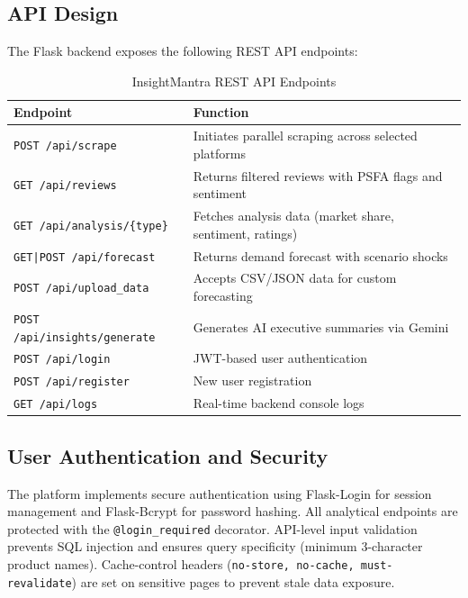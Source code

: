 \documentclass[conference]{IEEEtran}
\begin{document}
\subsection{API Design}

The Flask backend exposes the following REST API endpoints:

\begin{table}[htbp]
\caption{InsightMantra REST API Endpoints}
\begin{center}
\begin{tabular}{p{2.8cm}p{4.7cm}}
\toprule
\textbf{Endpoint} & \textbf{Function} \\
\midrule
\texttt{POST /api/scrape} & Initiates parallel scraping across selected platforms \\
\texttt{GET /api/reviews} & Returns filtered reviews with PSFA flags and sentiment \\
\texttt{GET /api/analysis/\{type\}} & Fetches analysis data (market share, sentiment, ratings) \\
\texttt{GET|POST /api/forecast} & Returns demand forecast with scenario shocks \\
\texttt{POST /api/upload\_data} & Accepts CSV/JSON data for custom forecasting \\
\texttt{POST /api/insights/generate} & Generates AI executive summaries via Gemini \\
\texttt{POST /api/login} & JWT-based user authentication \\
\texttt{POST /api/register} & New user registration \\
\texttt{GET /api/logs} & Real-time backend console logs \\
\bottomrule
\end{tabular}
\label{tab:api}
\end{center}
\end{table}

\subsection{User Authentication and Security}

The platform implements secure authentication using Flask-Login for session management and Flask-Bcrypt for password hashing. All analytical endpoints are protected with the \texttt{@login\_required} decorator. API-level input validation prevents SQL injection and ensures query specificity (minimum 3-character product names). Cache-control headers (\texttt{no-store, no-cache, must-revalidate}) are set on sensitive pages to prevent stale data exposure.
\end{document}
